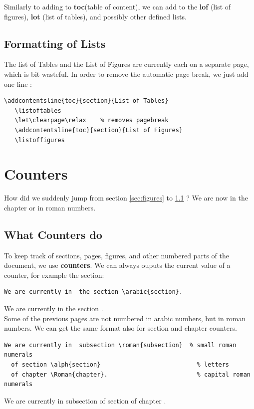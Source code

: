 \documentclass[a4paper,10pt]{report} %
\begin{document}
Similarly to adding to \textbf{toc}(table of content), we can add to the 
\textbf{lof} (list of figures), \textbf{lot} (list of tables), and possibly other defined lists.   

\subsection{Formatting of Lists}

The list of Tables and the List of Figures are currently each on a separate page, which is bit wasteful. In order to remove the automatic page break, we just add one line : 
\begin{lstlisting}[language={[latex]tex}, frame=single,basicstyle=\footnotesize]
   \addcontentsline{toc}{section}{List of Tables}
   \listoftables  
   \let\clearpage\relax    % removes pagebreak                       
   \addcontentsline{toc}{section}{List of Figures}  
   \listoffigures
\end{lstlisting}

 \setcounter{section}{1}
 \section{Counters}%
How did we suddenly jump from section \ref{sec:figures} to \ref{sec:counters}  ? We are now in the chapter  or  in roman numbers.\\

\subsection{What Counters do}\label{sec:counters}
To keep track of sections, pages, figures, and other numbered parts of the document, we use \textbf{counters}. We can always ouputs the current value of a counter, for example the section:
\begin{lstlisting}[language={[latex]tex}, frame=single,basicstyle=\footnotesize]
  We are currently in  the section \arabic{section}.
\end{lstlisting}

We are currently in  the section .\\

Some of the previous pages are not numbered in arabic numbers, but in roman numbers. We can get the same format also for section and chapter counters. 

\begin{lstlisting}[language={[latex]tex}, frame=single,basicstyle=\footnotesize]
  We are currently in  subsection \roman{subsection}  % small roman numerals 
  of section \alph{section}                           % letters
  of chapter \Roman{chapter}.                         % capital roman numerals
\end{lstlisting}
 We are currently in  subsection   %
  of section                            %
  of chapter . \\                      %
\end{document}
